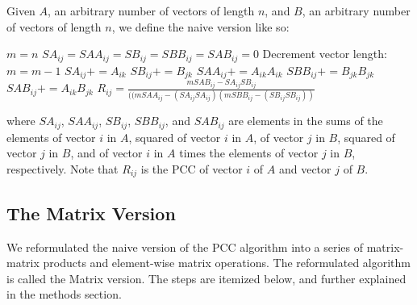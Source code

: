 \documentclass{bioinfo}
\begin{document}
Given $A$, an arbitrary number of vectors of length $n$, and $B$, an arbitrary number of vectors of length $n$, 
we define the naive version like so:

\vspace{2mm}

\begin{algorithmic}[1]
    \STATE $m=n$
    \STATE $SA_{ij}=SAA_{ij}=SB_{ij}=SBB_{ij}=SAB_{ij}=0$
        \STATE Decrement vector length: $m=m-1$
      \ELSE
        \STATE $SA_{ij}+=A_{ik}$
        \STATE $SB_{ij}+=B_{jk}$
        \STATE $SAA_{ij}+=A_{ik}A_{ik}$
        \STATE $SBB_{ij}+=B_{jk}B_{jk}$
        \STATE $SAB_{ij}+=A_{ik}B_{jk}$
      \ENDIF
    \ENDFOR 
    \STATE $R_{ij}=\frac{mSAB_{ij}-SA_{ij}SB_{ij}}{((mSAA_{ij}-(SA_{ij}SA_{ij})(mSBB_{ij}-(SB_{ij}SB_{ij}))}$
  \ENDFOR
\ENDFOR
\end{algorithmic}

\vspace{2mm}

\noindent where 
$SA_{ij}$,
$SAA_{ij}$, 
$SB_{ij}$, 
$SBB_{ij}$, and $SAB_{ij}$ 
are elements in the sums of the elements 
of vector $i$ in $A$, 
squared of vector $i$ in $A$, 
of vector $j$ in $B$, 
squared of vector $j$ in $B$, and
of vector $i$ in $A$ times the  elements of vector $j$ in $B$, respectively.
Note that $R_{ij}$ is the PCC of vector $i$ of $A$ and vector $j$ of $B$.

\subsection{The Matrix Version}
We reformulated the naive version of the PCC algorithm into a series of 
matrix-matrix products and element-wise matrix operations. The 
reformulated algorithm is called the Matrix version. The steps are itemized below, and further explained in the methods section.
\vspace{2mm}
\end{document}
